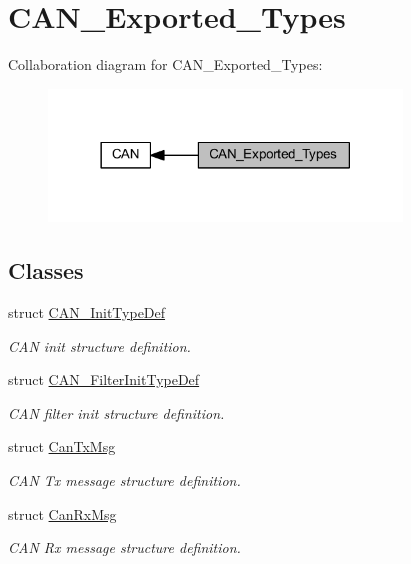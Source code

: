 \hypertarget{group___c_a_n___exported___types}{}\section{C\+A\+N\+\_\+\+Exported\+\_\+\+Types}
\label{group___c_a_n___exported___types}
Collaboration diagram for C\+A\+N\+\_\+\+Exported\+\_\+\+Types\+:
\nopagebreak
\begin{figure}[H]
\begin{center}
\leavevmode
\includegraphics[width=266pt]{group___c_a_n___exported___types}
\end{center}
\end{figure}
\subsection*{Classes}
\begin{DoxyCompactItemize}
\item 
struct \hyperlink{struct_c_a_n___init_type_def}{C\+A\+N\+\_\+\+Init\+Type\+Def}
\begin{DoxyCompactList}\small\item\em C\+AN init structure definition. \end{DoxyCompactList}\item 
struct \hyperlink{struct_c_a_n___filter_init_type_def}{C\+A\+N\+\_\+\+Filter\+Init\+Type\+Def}
\begin{DoxyCompactList}\small\item\em C\+AN filter init structure definition. \end{DoxyCompactList}\item 
struct \hyperlink{struct_can_tx_msg}{Can\+Tx\+Msg}
\begin{DoxyCompactList}\small\item\em C\+AN Tx message structure definition. \end{DoxyCompactList}\item 
struct \hyperlink{struct_can_rx_msg}{Can\+Rx\+Msg}
\begin{DoxyCompactList}\small\item\em C\+AN Rx message structure definition. \end{DoxyCompactList}\end{DoxyCompactItemize}
